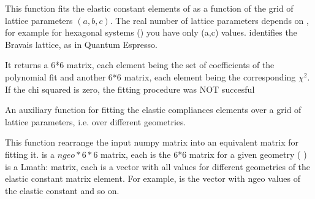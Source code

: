 \documentclass[letterpaper,10pt,english]{sphinxmanual}
\begin{document}

\begin{fulllineitems}
\label{pyqha:pyqha.fitC.fitCxx}
This function fits the elastic constant elements of  as a function of the
grid of lattice parameters \((a,b,c)\). 
The real number of lattice parameters depends on , for example for 
hexagonal systems () you have only (a,c) values.  identifies
the Bravais lattice, as in Quantum Espresso.

It returns a 6*6 matrix, each element \sphinxstyleemphasis{{[}i,j{]}} being the set of coefficients of the 
polynomial fit and another 6*6 matrix, each element \sphinxstyleemphasis{{[}i,j{]}} being the corresponding
\(\chi^2\). If the chi squared is zero, the fitting procedure was NOT succesful

\end{fulllineitems}


\begin{fulllineitems}
\label{pyqha:pyqha.fitC.fitS}
An auxiliary function for fitting the elastic compliances elements over a
grid of lattice parameters, i.e. over different geometries.

\end{fulllineitems}


\begin{fulllineitems}
\label{pyqha:pyqha.fitC.rearrange_Cx}
This function rearrange the input numpy matrix  into an equivalent matrix 
for fitting it.
 is a \(ngeo*6*6\) matrix, each  is the 6*6  matrix for a given geometry (  )
 is a Lmath: matrix, each  is a vector with all values for different
geometries of the  elastic constant matrix element. For example, 
is the vector with ngeo values of the  elastic constant and so on.

\end{fulllineitems}
\end{document}
